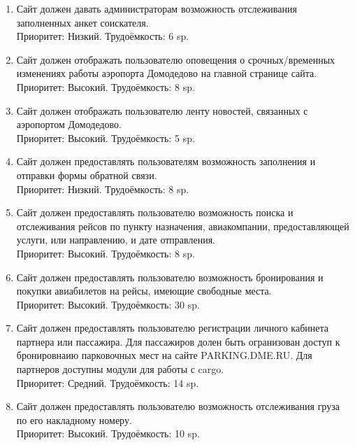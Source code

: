 \begin{enumerate}
      \item Сайт должен давать администраторам возможность
            отслеживания заполненных анкет соискателя. \\
            Приоритет: Низкий. Трудоёмкость: 6 sp.

      \item Сайт должен отображать пользователю оповещения о
            срочных/временных изменениях работы аэропорта
            Домодедово на главной странице сайта. \\
            Приоритет: Высокий. Трудоёмкость: 8 sp.

      \item Сайт должен отображать пользователю ленту
            новостей, связанных с аэропортом Домодедово. \\
            Приоритет: Высокий. Трудоёмкость: 5 sp.

      \item Сайт должен предоставлять пользователям возможность заполнения
            и отправки формы обратной связи. \\
            Приоритет: Низкий. Трудоёмкость: 8 sp.

      \item Сайт должен предоставлять пользователю возможность поиска
            и отслеживания рейсов по пункту назначения,
            авиакомпании, предоставляющей услуги, или
            направлению, и дате отправления. \\
            Приоритет: Высокий. Трудоёмкость: 8 sp.

      \item Сайт должен предоставлять пользователю возможность бронирования
            и покупки авиабилетов на рейсы, имеющие
            свободные места. \\
            Приоритет: Высокий. Трудоёмкость: 30 sp.

      \item Сайт должен предоставлять пользователю
            регистрации личного кабинета партнера или
            пассажира. Для пассажиров долен быть
            огранизован доступ к бронировнаию парковочных
            мест на сайте PARKING.DME.RU. Для партнеров
            доступны модули для работы с cargo. \\
            Приоритет: Средний. Трудоёмкость: 14 sp.

      \item Сайт должен предоставлять пользователю возможность
            отслеживания груза по его накладному номеру. \\
            Приоритет: Высокий. Трудоёмкость: 10 sp.


\end{enumerate}
